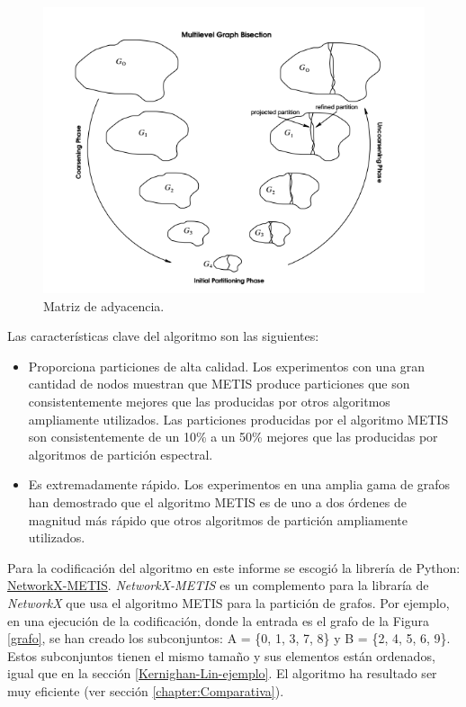 \begin{figure}[h]
	\centering
	\includegraphics[scale=0.7]{Figures/metis}
	\vspace{1mm}
	\caption{Matriz de adyacencia.}
	\label{metis}
\end{figure}

Las características clave del algoritmo son las siguientes:

\begin{itemize}
	\item Proporciona particiones de alta calidad. Los experimentos con una gran cantidad de nodos muestran que METIS produce particiones que son consistentemente mejores que las producidas por otros algoritmos ampliamente utilizados. Las particiones producidas por el algoritmo METIS son consistentemente de un 10\% a un 50\% mejores que las producidas por algoritmos de partición espectral.
	\item Es extremadamente rápido. Los experimentos en una amplia gama de grafos han demostrado que el algoritmo METIS es de uno a dos órdenes de magnitud más rápido que otros algoritmos de partición ampliamente utilizados.
\end{itemize}

Para la codificación del algoritmo en este informe se escogió la librería de Python: \href{https://networkx-metis.readthedocs.io/en/latest/reference/generated/nxmetis.partition.html#nxmetis.partition}{NetworkX-METIS}. \textit{NetworkX-METIS} es un complemento para la libraría de \textit{NetworkX} que usa el algoritmo METIS para la partición de grafos. Por ejemplo, en una ejecución de la codificación, donde la entrada es el grafo de la Figura \ref{grafo}, se han creado los subconjuntos: A = \{0, 1, 3, 7, 8\} y B = \{2, 4, 5, 6, 9\}. Estos subconjuntos tienen el mismo tamaño y sus elementos están ordenados, igual que en la sección \ref{Kernighan-Lin-ejemplo}. El algoritmo ha resultado ser muy eficiente (ver sección \ref{chapter:Comparativa}).